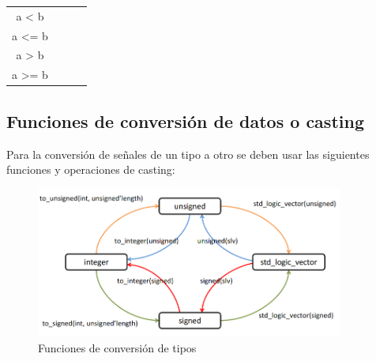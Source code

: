 \begin{table}[H]
\begin{tabular}{|c|c|c|c|}
		a < b              &                                                     &                                                     &                                   \\
		\cline{1-1}
		a <= b             &                                                     &                                                     &                                   \\
		\cline{1-1}
		a > b              &                                                     &                                                     &                                   \\
		\cline{1-1}
		a >= b             &                                                     &                                                     &                                   \\
		\hline
	\end{tabular}
\end{table}

\subsection{Funciones de conversión de datos o casting}
Para la conversión de señales de un tipo a otro se deben usar las siguientes funciones y operaciones de casting:

\begin{figure}[H]
	\centering
	\includegraphics[width=0.9\textwidth]{images/Tema_3/casting.PNG}
	\caption{Funciones de conversión de tipos}
\end{figure}
